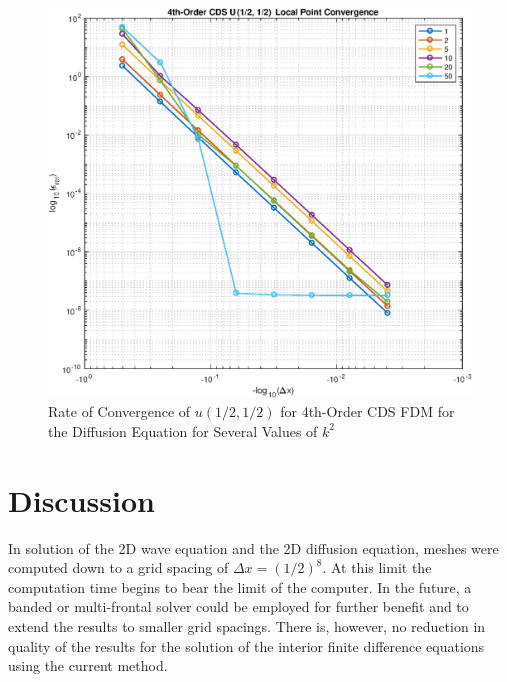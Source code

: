 \documentclass[10pt]{article}		%
\numberwithin{equation}{section}
\begin{document}
\begin{figure}[H]
	\begin{center}
				\includegraphics[width = 0.8\linewidth]{minus_order_4_u_avg}
		\caption{Rate of Convergence of $u(1/2, 1/2)$ for 4th-Order CDS FDM for the Diffusion Equation for Several Values of $k^2$}	
	\end{center}
\end{figure}

\begin{table}[H]
		
\end{table}

\newpage

\section{Discussion}

In solution of the 2D wave equation and the 2D diffusion equation, meshes were computed down to a grid spacing of $\Delta x = (1/2)^8$. At this limit the computation time begins to bear the limit of the computer. In the future, a banded or multi-frontal solver could be employed for further benefit and to extend the results to smaller grid spacings. There is, however, no reduction in quality of the results for the solution of the interior finite difference equations using the current method.
\end{document}
